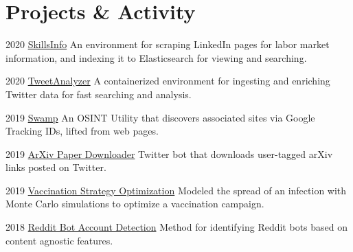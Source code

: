 \documentclass{tccv}
\begin{document}
\section{Projects \& Activity}
\begin{yearlist}
	\item  {2020}
	{\href{https://github.com/markditsworth/SkillsInfo}{SkillsInfo}}
	{An environment for scraping LinkedIn pages for labor market information, and indexing it to Elasticsearch for viewing and searching.}
	
	\item {2020}
	{\href{https://github.com/markditsworth/TweetAnalyzer}{TweetAnalyzer}}
	{A containerized environment for ingesting and enriching Twitter data for fast searching and analysis.}
	
	\item {2019}
	{\href{https://github.com/jakecreps/swamp}{Swamp}}
	{An OSINT Utility that discovers associated sites via Google Tracking IDs, lifted from web pages.}
	
	
	\item{2019}
	{\href{https://github.com/markditsworth/PaperDownload}{ArXiv Paper Downloader}}
	{Twitter bot that downloads user-tagged arXiv links posted on Twitter.}
	
	
	\item{2019}
	{\href{https://towardsdatascience.com/infection-modeling-part-1-87e74645568a}{Vaccination Strategy Optimization}}
	{Modeled the spread of an infection with Monte Carlo simulations to optimize a vaccination campaign.}
	
	\item{2018}
	{\href{https://chatbotslife.com/bot-detection-with-network-science-dde6525005f2}{Reddit Bot Account Detection}}
	{Method for identifying Reddit bots based on content agnostic features.}
	
	
\end{yearlist}
\end{document}
